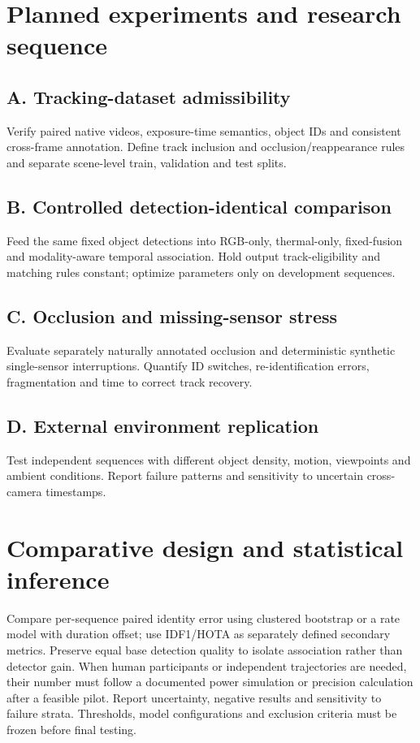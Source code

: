 \documentclass[11pt,a4paper]{article}
\begin{document}
\section{Planned experiments and research sequence}
\subsection{A. Tracking-dataset admissibility}
Verify paired native videos, exposure-time semantics, object IDs and consistent cross-frame annotation. Define track inclusion and occlusion/reappearance rules and separate scene-level train, validation and test splits.

\subsection{B. Controlled detection-identical comparison}
Feed the same fixed object detections into RGB-only, thermal-only, fixed-fusion and modality-aware temporal association. Hold output track-eligibility and matching rules constant; optimize parameters only on development sequences.

\subsection{C. Occlusion and missing-sensor stress}
Evaluate separately naturally annotated occlusion and deterministic synthetic single-sensor interruptions. Quantify ID switches, re-identification errors, fragmentation and time to correct track recovery.

\subsection{D. External environment replication}
Test independent sequences with different object density, motion, viewpoints and ambient conditions. Report failure patterns and sensitivity to uncertain cross-camera timestamps.

\section{Comparative design and statistical inference}
Compare per-sequence paired identity error using clustered bootstrap or a rate model with duration offset; use IDF1/HOTA as separately defined secondary metrics. Preserve equal base detection quality to isolate association rather than detector gain. When human participants or independent trajectories are needed, their number must follow a documented power simulation or precision calculation after a feasible pilot. Report uncertainty, negative results and sensitivity to failure strata. Thresholds, model configurations and exclusion criteria must be frozen before final testing.
\end{document}
